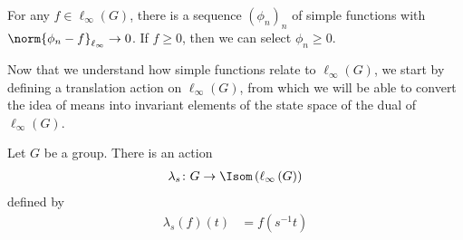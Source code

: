 \begin{corollary}
  For any $f\in \ell_{\infty}\left(G\right)$, there is a sequence $\left(\phi_n\right)_n$ of simple functions with $\norm{\phi_n -f}_{\ell_{\infty}}\rightarrow 0$. If $f\geq 0$, then we can select $\phi_n\geq 0$.
\end{corollary}
Now that we understand how simple functions relate to $\ell_{\infty}(G)$, we start by defining a translation action on $\ell_{\infty}(G)$, from which we will be able to convert the idea of means into invariant elements of the state space of the dual of $\ell_{\infty}\left(G\right)$.
\begin{proposition}\label{prop:translation_action}
  Let $G$ be a group. There is an action
  \begin{align*}
    \lambda_s\colon G\rightarrow \Isom\left(\ell_{\infty}\left(G\right)\right)
  \end{align*}
  defined by
  \begin{align*}
    \lambda_{s}\left(f\right)\left(t\right) &= f\left(s^{-1}t\right)
  \end{align*}
\end{proposition}
